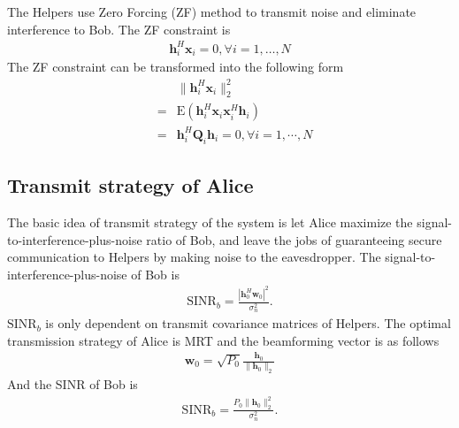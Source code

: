 \documentclass[conference]{IEEEtran}
\begin{document}

The Helpers use Zero Forcing (ZF) method to transmit noise and eliminate interference to Bob.
The ZF constraint is 
\begin{eqnarray}
\mathbf{h}_i^H\mathbf{x}_i =0 , \forall i = 1,\dots, N\label{eq:ZF_constraint}
\end{eqnarray}
The ZF constraint can be transformed into the following form
\begin{eqnarray}
&&\|\mathbf{h}_i^H\mathbf{x}_i\|_2^2\\
&=&\mathrm{E}(\mathbf{h}_i^H\mathbf{x}_i\mathbf{x}_i^H\mathbf{h}_i)\\
&=&\mathbf{h}_i^H\mathbf{Q}_i \mathbf{h}_i = 0, \forall i = 1,\cdots,N \label{eq:ZF_constraint_relaxed}
\end{eqnarray}
\subsection{Transmit strategy of Alice}
The basic idea of transmit strategy of the system is let Alice maximize the signal-to-interference-plus-noise ratio of Bob, and leave the jobs of guaranteeing secure communication  to Helpers by making noise to the eavesdropper.  The signal-to-interference-plus-noise of Bob is 
\begin{eqnarray}
\mathrm{SINR}_b= \frac{\left| \mathbf{h}_{0}^H\mathbf{w}_{0}\right|^2}{\sigma_n^2 }. 
\end{eqnarray}
$\mathrm{SINR}_b$ is only dependent on transmit covariance matrices of Helpers. The optimal transmission strategy of Alice is MRT and the beamforming vector is as follows
\begin{eqnarray}
\mathbf{w}_0 = \sqrt{P_0}\frac{\mathbf{h}_0}{\|\mathbf{h}_0\|_2} \label{eq:optimal_w}
\end{eqnarray}
And the SINR of Bob is
\begin{eqnarray} 
\mathrm{SINR}_b= \frac{P_0\| \mathbf{h}_{0}\|_2^2}{\sigma_n^2 }.  \label{eq:SINR_b}
\end{eqnarray}
\end{document}
